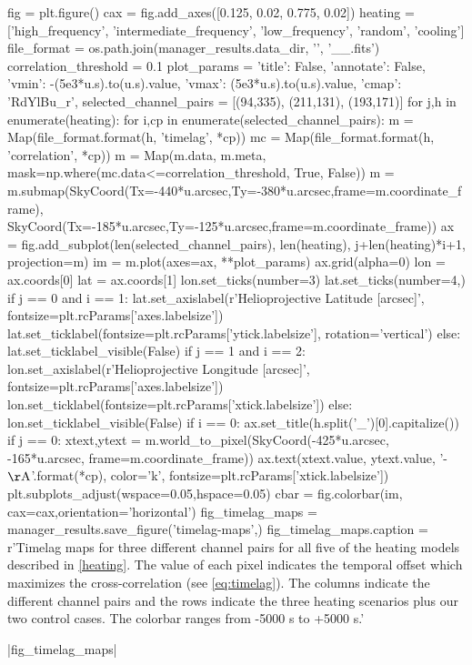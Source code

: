 \begin{pycode}
fig = plt.figure()
cax = fig.add_axes([0.125, 0.02, 0.775, 0.02])
heating = ['high_frequency', 'intermediate_frequency', 'low_frequency', 'random', 'cooling']
file_format = os.path.join(manager_results.data_dir, '{}', '{}_{}_{}.fits')
correlation_threshold = 0.1
plot_params = {'title': False, 'annotate': False, 'vmin': -(5e3*u.s).to(u.s).value,
               'vmax': (5e3*u.s).to(u.s).value, 'cmap': 'RdYlBu_r',}
selected_channel_pairs = [(94,335), (211,131), (193,171)]
for j,h in enumerate(heating):
    for i,cp in enumerate(selected_channel_pairs):
        m = Map(file_format.format(h, 'timelag', *cp))
        mc = Map(file_format.format(h, 'correlation', *cp))
        m = Map(m.data, m.meta, mask=np.where(mc.data<=correlation_threshold, True, False))
        m = m.submap(SkyCoord(Tx=-440*u.arcsec,Ty=-380*u.arcsec,frame=m.coordinate_frame),
                     SkyCoord(Tx=-185*u.arcsec,Ty=-125*u.arcsec,frame=m.coordinate_frame))
        ax = fig.add_subplot(len(selected_channel_pairs), len(heating), j+len(heating)*i+1,
                             projection=m)
        im = m.plot(axes=ax, **plot_params)
        ax.grid(alpha=0)
        lon = ax.coords[0]
        lat = ax.coords[1]
        lon.set_ticks(number=3)
        lat.set_ticks(number=4,) 
        if j == 0 and i == 1:
            lat.set_axislabel(r'Helioprojective Latitude [arcsec]', fontsize=plt.rcParams['axes.labelsize'])
            lat.set_ticklabel(fontsize=plt.rcParams['ytick.labelsize'], rotation='vertical')
        else:
            lat.set_ticklabel_visible(False)
        if j == 1 and i == 2:
            lon.set_axislabel(r'Helioprojective Longitude [arcsec]', fontsize=plt.rcParams['axes.labelsize'])
            lon.set_ticklabel(fontsize=plt.rcParams['xtick.labelsize'])
        else:
            lon.set_ticklabel_visible(False)
        if i == 0:
            ax.set_title(h.split('_')[0].capitalize())
        if j == 0:
            xtext,ytext = m.world_to_pixel(SkyCoord(-425*u.arcsec, -165*u.arcsec, frame=m.coordinate_frame))
            ax.text(xtext.value, ytext.value, '{}-{} $\mathrm{{\AA}}$'.format(*cp),
                    color='k', fontsize=plt.rcParams['xtick.labelsize'])
plt.subplots_adjust(wspace=0.05,hspace=0.05)
cbar = fig.colorbar(im, cax=cax,orientation='horizontal')
fig_timelag_maps = manager_results.save_figure('timelag-maps',)
fig_timelag_maps.caption = r'Timelag maps for three different channel pairs for all five of the heating models described in \autoref{heating}. The value of each pixel indicates the temporal offset which maximizes the cross-correlation (see \autoref{eq:timelag}). The columns indicate the different channel pairs and the rows indicate the three heating scenarios plus our two control cases. The colorbar ranges from -5000 s to +5000 s.'
\end{pycode}
|fig_timelag_maps|

